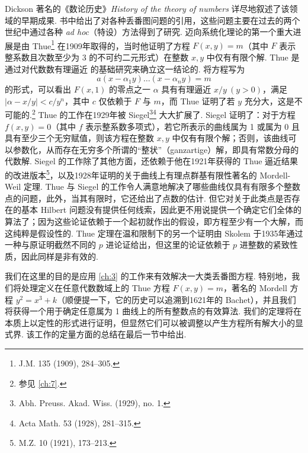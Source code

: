 Dickson 著名的《数论历史》\textit{History of the theory of numbers} 详尽地叙述了该领域的早期成果. 书中给出了对各种丢番图问题的引用，这些问题主要在过去的两个世纪中通过各种 \textit{ad hoc}（特设）方法得到了研究. 迈向系统化理论的第一个重大进展是由 Thue\footnote{J.M. 135 (1909), 284--305.} 在1909年取得的，当时他证明了方程 $F(x,y) = m$（其中 $F$ 表示整系数且次数至少为 3 的不可约二元形式）在整数 $x, y$ 中仅有有限个解. Thue 是通过对代数数有理逼近 的基础研究来确立这一结论的. 将方程写为
\[
a(x-\alpha_1 y)\dots(x-\alpha_n y)=m
\]
的形式，可以看出 $F(x, 1)$ 的零点之一 $\alpha$ 具有有理逼近 $x/y \ (y > 0)$，满足 $|\alpha - x/y| < c/y^n$，其中 $c$ 仅依赖于 $F$ 与 $m$，而 Thue 证明了若 $y$ 充分大，这是不可能的.\footnote{参见 \autoref{ch:7}.} Thue 的工作在1929年被 Siegel\footnote{Abh. Preuss. Akad. Wiss. (1929), no. 1.}\footnote{Acta Math. 53 (1928), 281--315.} 大大扩展了. Siegel 证明了：对于方程 $f(x, y) = 0$（其中 $f$ 表示整系数多项式），若它所表示的曲线属为 1 或属为 0 且具有至少三个无穷赋值，则该方程在整数 $x, y$ 中仅有有限个解；否则，该曲线可以参数化，从而存在无穷多个所谓的“整状”（ganzartige）解，即具有常数分母的代数解. Siegel 的工作除了其他方面，还依赖于他在1921年获得的 Thue 逼近结果的改进版本\footnote{M.Z. 10 (1921), 173--213.}，以及1928年证明的关于曲线上有理点群基有限性著名的 Mordell-Weil 定理. Thue 与 Siegel 的工作令人满意地解决了哪些曲线仅具有有限多个整数点的问题，此外，当其有限时，它还给出了点数的估计. 但它对关于此类点是否存在的基本 Hilbert 问题没有提供任何线索，因此更不用说提供一个确定它们全体的算法了；因为这些论证依赖于一个起初就作出的假设，即方程至少有一个大解，而这纯粹是假设性的. Thue 定理在温和限制下的另一个证明由 Skolem 于1935年通过一种与原证明截然不同的 $p$ 进论证给出，但这里的论证依赖于 $p$ 进整数的紧致性质，因此同样是非有效的.

我们在这里的目的是应用 \autoref{ch:3} 的工作来有效解决一大类丢番图方程. 特别地，我们将处理定义在任意代数数域上的 Thue 方程 $F(x,y)=m$，著名的 Mordell 方程 $y^2=x^3+k$（顺便提一下，它的历史可以追溯到1621年的 Bachet），并且我们将获得一个用于确定任意属为 1 曲线上的所有整数点的有效算法. 我们的定理将在本质上以定性的形式进行证明，但显然它们可以被调整以产生方程所有解大小的显式界. 该工作的定量方面的总结在最后一节中给出.

